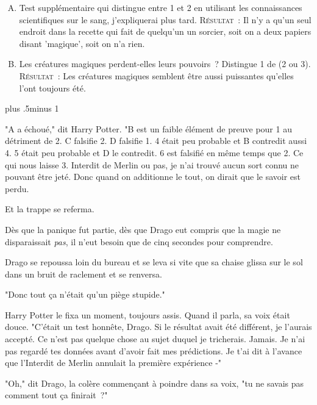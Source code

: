 \begin{centering}
\begin{samepage}
\begin{enumerate}[A.]{
                \firmlist
                \setlength{\leftmargin}{\parindent}
                \setlength{\rightmargin}{1cm}}
        \item Test supplémentaire qui distingue entre 1 et 2 en utilisant les connaissances scientifiques sur le sang, j'expliquerai plus tard. {\scshape Résultat~:} Il n'y a qu'un seul endroit dans la recette qui fait de quelqu'un un sorcier, soit on a deux papiers disant 'magique', soit on n'a rien.

        \item Les créatures magiques perdent-elles leurs pouvoirs~? Distingue 1 de (2 ou 3). {\scshape Résultat~:} Les créatures magiques semblent être aussi puissantes qu'elles l'ont toujours été.
        \end{enumerate}
\end{samepage}
\end{centering}
\baselineskip plus .5\textheight minus 1\baselineskip
\restoretrivseps

"A a échoué," dit Harry Potter. "B est un faible élément de preuve pour 1 au détriment de 2. C falsifie 2. D falsifie 1. 4 était peu probable et B contredit aussi 4. 5 était peu probable et D le contredit. 6 est falsifié en même temps que 2. Ce qui nous laisse 3. Interdit de Merlin ou pas, je n'ai trouvé aucun sort connu ne pouvant être jeté. Donc quand on additionne le tout, on dirait que le savoir est perdu.

Et la trappe se referma.

Dès que la panique fut partie, dès que Drago eut compris que la magie ne disparaissait \emph{pas}, il n'eut besoin que de cinq secondes pour comprendre.

Drago se repoussa loin du bureau et se leva si vite que sa chaise glissa sur le sol dans un bruit de raclement et se renversa.

"Donc tout ça n'était qu'un piège stupide."

Harry Potter le fixa un moment, toujours assis. Quand il parla, sa voix était douce. "C'était un test honnête, Drago. Si le résultat avait été différent, je l'aurais accepté. Ce n'est pas quelque chose au sujet duquel je tricherais. Jamais. Je n'ai pas regardé tes données avant d'avoir fait mes prédictions. Je t'ai dit à l'avance que l'Interdit de Merlin annulait la première expérience -"

"Oh," dit Drago, la colère commençant à poindre dans sa voix, "tu ne savais pas comment tout ça finirait~?"

